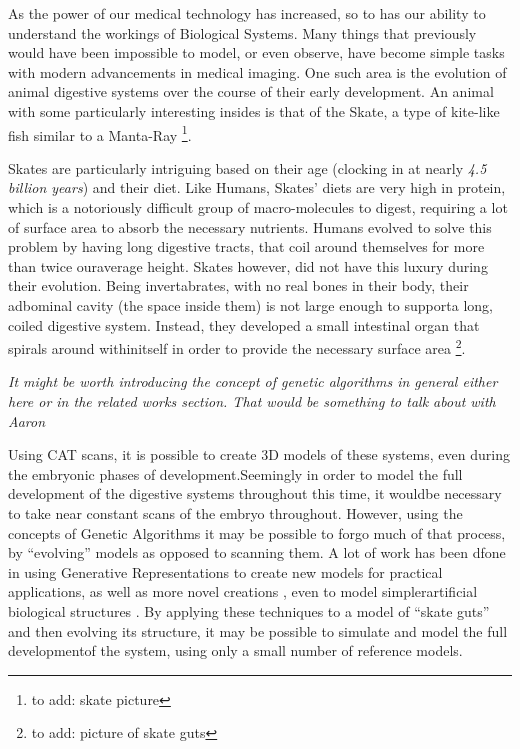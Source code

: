 \documentclass[condensed]{union-cs-thesis}
\begin{document}
\vspace{.5cm}
As the power of our medical technology has increased, so to has our ability to understand the workings
of Biological Systems. Many things that previously would have been impossible to model, or even observe, 
have become simple tasks with modern advancements in medical imaging. One such area is the evolution
of animal digestive systems over the course of their early development. An animal with some particularly
interesting insides is that of the Skate, a type of kite-like fish similar to a Manta-Ray
\footnote{to add: skate picture}.
\par
Skates are particularly intriguing based on their age (clocking in at nearly \emph{4.5 billion years})
and their diet. Like Humans, Skates' diets are very high in protein, which is a notoriously difficult
group of macro-molecules to digest, requiring a lot of surface area to absorb the necessary nutrients.
Humans evolved to solve this problem by having long digestive tracts, that coil around themselves for
more than twice ouraverage height.  Skates however, did not have this luxury during their evolution.
Being invertabrates, with no real bones in their body, their adbominal cavity (the space inside them)
is not large enough to supporta long, coiled digestive system. Instead, they developed a small
intestinal organ that spirals around withinitself in order to provide the necessary surface area
\footnote{to add: picture of skate guts}.

\par
\emph{It might be worth introducing the concept of genetic algorithms in general either here or in
  the related  works section.  That would be something to talk about with Aaron}

\par
Using CAT scans, it is possible to create 3D models of these systems, even during the embryonic phases
of development.Seemingly in order to model the full development of the digestive systems throughout this
time, it wouldbe necessary to take near constant scans of the embryo throughout.  However, using the
concepts of Genetic Algorithms it may be possible to forgo much of that process, by ``evolving'' models
as opposed to scanning them.  A lot of work has been dfone in using Generative Representations to create
new models for practical applications\cite{rieffel2009automated}, as well as more novel creations
\cite{hornby2004functional}, even to model simplerartificial biological structures
\cite{toussaint2003demonstrating}.  By applying these techniques to a model of ``skate guts'' and then
evolving its structure, it may be possible to simulate and model the full developmentof the system,
using only a small number of reference models.
\end{document}
